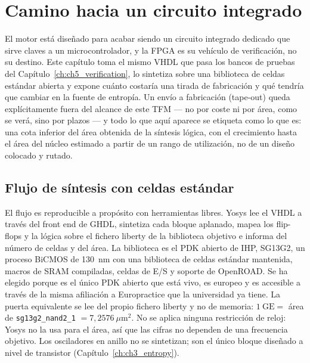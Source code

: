 \chapter{Camino hacia un circuito integrado}
\label{ch:ch6_asic}


El motor está diseñado para acabar siendo un circuito integrado dedicado que
sirve claves a un microcontrolador, y la FPGA es su vehículo de
verificación, no su destino. Este capítulo toma el mismo VHDL que pasa los
bancos de pruebas del Capítulo~\ref{ch:ch5_verification}, lo sintetiza
sobre una biblioteca de celdas estándar abierta y expone cuánto costaría una
tirada de fabricación y qué tendría que cambiar en la fuente de entropía. Un
envío a fabricación (tape-out) queda explícitamente fuera del alcance de este TFM
--- no por coste ni por área, como se verá, sino por plazos --- y todo lo que
aquí aparece se etiqueta como lo que es: una cota inferior del área obtenida de
la síntesis lógica, con el crecimiento hasta el área del núcleo estimado a
partir de un rango de utilización, no de un diseño colocado y rutado.

\section{Flujo de síntesis con celdas estándar}
\label{sec:synthflow}

El flujo es reproducible a propósito con herramientas libres. Yosys lee el
VHDL a través del front end de GHDL, sintetiza cada bloque aplanado, mapea
los flip-flops y la lógica sobre el fichero liberty de la biblioteca objetivo
e informa del número de celdas y del área. La biblioteca es el \ac{PDK}
abierto de IHP, SG13G2, un proceso BiCMOS de 130~nm con una biblioteca de
celdas estándar mantenida, macros de SRAM compiladas, celdas de E/S y soporte
de OpenROAD. Se ha elegido porque es el único \ac{PDK} abierto que está vivo,
es europeo y es accesible a través de la misma afiliación a Europractice que
la universidad ya tiene. La puerta equivalente se lee del propio fichero
liberty y no de memoria:
$1~\mathrm{GE} = $ área de \texttt{sg13g2\_nand2\_1} $= 7{,}2576~\mu\mathrm{m}^2$.
No se aplica ninguna restricción de reloj: Yosys no la usa para el área, así
que las cifras no dependen de una frecuencia objetivo. Los osciladores en
anillo no se sintetizan; son el único bloque diseñado a nivel de transistor
(Capítulo~\ref{ch:ch3_entropy}).

